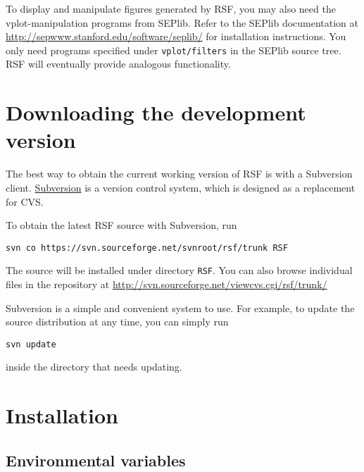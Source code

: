 To display and manipulate figures generated by RSF, you may also need the
vplot-manipulation programs from SEPlib. Refer to the SEPlib documentation at
\\ \url{http://sepwww.stanford.edu/software/seplib/} for installation
instructions. You only need programs specified under \texttt{vplot/filters} in
the SEPlib source tree. RSF will eventually provide analogous functionality.

\section{Downloading the development version}

The best way to obtain the current working version of RSF is with a Subversion
client. \href{http://subversion.tigris.org/}{Subversion} is a version control
system, which is designed as a replacement for CVS.

To obtain the latest RSF source with Subversion, run 
\begin{verbatim}
svn co https://svn.sourceforge.net/svnroot/rsf/trunk RSF
\end{verbatim}
The source will be installed under directory \texttt{RSF}. You can also browse
individual files in the repository at
\url{http://svn.sourceforge.net/viewcvs.cgi/rsf/trunk/}

Subversion is a simple and convenient system to use. For example, to update
the source distribution at any time, you can simply run
\begin{verbatim}
svn update
\end{verbatim}
inside the directory that needs updating.

\begin{comment}
If you cannot get Subversion to work at your location, download the tarball
file by following the link at \url{http://egl.beg.utexas.edu/viewcvs/}.
In this case, you will need to run
\begin{verbatim}
gunzip < root.tar.gz | tar xvf -
cd rsf/trunk
chmod a+x python/sfdoc
\end{verbatim}
to prepare software for installation.
\end{comment}

\section{Installation}

\subsection{Environmental variables}

